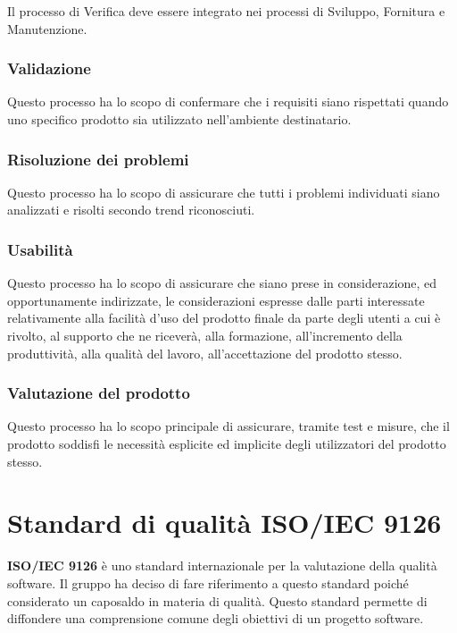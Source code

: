 Il processo di Verifica deve essere integrato nei processi di Sviluppo, Fornitura e Manutenzione.


\subsubsection{Validazione}

Questo processo ha lo scopo di confermare che i requisiti siano rispettati quando uno specifico prodotto sia utilizzato nell'ambiente destinatario.

\subsubsection{Risoluzione dei problemi}

Questo processo ha lo scopo di assicurare che tutti i problemi individuati siano analizzati e risolti secondo trend riconosciuti.


\subsubsection{Usabilità}

Questo processo ha lo scopo di assicurare che siano prese in considerazione, ed opportunamente indirizzate, le considerazioni espresse dalle parti interessate relativamente alla facilità d'uso del prodotto finale da parte degli utenti a cui è rivolto, al supporto che ne riceverà, alla formazione, all'incremento della produttività, alla qualità del lavoro, all'accettazione del prodotto stesso.


\subsubsection{Valutazione del prodotto}

Questo processo ha lo scopo principale di assicurare, tramite test e misure, che il prodotto soddisfi le necessità esplicite ed implicite degli utilizzatori del prodotto stesso.

\section{Standard di qualità ISO/IEC 9126}

\textbf{ISO/IEC 9126} è uno standard internazionale per la valutazione della qualità software.
Il gruppo \groupName{} ha deciso di fare riferimento a questo standard poiché considerato un caposaldo in materia di qualità.
Questo standard permette di diffondere una comprensione comune degli obiettivi di un progetto software.

